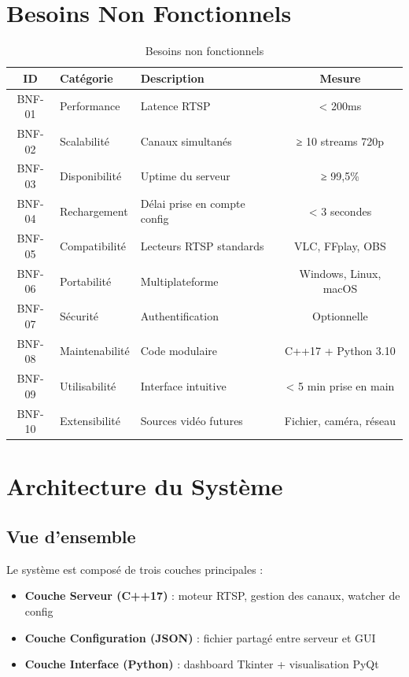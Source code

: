 \documentclass[12pt,a4paper]{report}
\begin{document}
\chapter{Besoins Non Fonctionnels}

\begin{table}[H]
    \centering
    \caption{Besoins non fonctionnels}
    \label{tab:bnf}
    \begin{tabular}{|c|l|l|c|}
        \hline
        \textbf{ID} & \textbf{Catégorie} & \textbf{Description} & \textbf{Mesure} \\
        \hline
        BNF-01 & Performance & Latence RTSP & < 200ms \\
        BNF-02 & Scalabilité & Canaux simultanés & ≥ 10 streams 720p \\
        BNF-03 & Disponibilité & Uptime du serveur & ≥ 99,5\% \\
        BNF-04 & Rechargement & Délai prise en compte config & < 3 secondes \\
        BNF-05 & Compatibilité & Lecteurs RTSP standards & VLC, FFplay, OBS \\
        BNF-06 & Portabilité & Multiplateforme & Windows, Linux, macOS \\
        BNF-07 & Sécurité & Authentification & Optionnelle \\
        BNF-08 & Maintenabilité & Code modulaire & C++17 + Python 3.10 \\
        BNF-09 & Utilisabilité & Interface intuitive & < 5 min prise en main \\
        BNF-10 & Extensibilité & Sources vidéo futures & Fichier, caméra, réseau \\
        \hline
    \end{tabular}
\end{table}

\chapter{Architecture du Système}

\section{Vue d'ensemble}

Le système est composé de trois couches principales :

\begin{itemize}
    \item \textbf{Couche Serveur (C++17)} : moteur RTSP, gestion des canaux, watcher de config
    \item \textbf{Couche Configuration (JSON)} : fichier partagé entre serveur et GUI
    \item \textbf{Couche Interface (Python)} : dashboard Tkinter + visualisation PyQt
\end{itemize}
\end{document}
